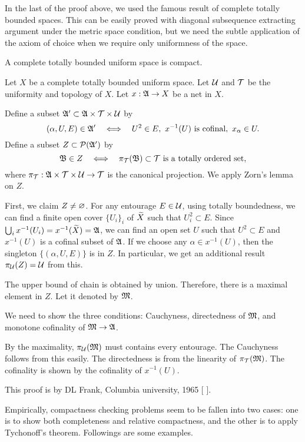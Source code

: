 \documentclass{../exp}
\begin{document}
In the last of the proof above, we used the famous result of complete totally bounded spaces.
This can be easily proved with diagonal subsequence extracting argument under the metric space condition, but we need the subtle application of the axiom of choice when we require only uniformness of the space.

\begin{thm}
A complete totally bounded uniform space is compact.
\end{thm}
\begin{pf}[1]
Let $X$ be a complete totally bounded uniform space.
Let $\mathcal{U}$ and $\mathcal{T}$ be the uniformity and topology of $X$.
Let $x:\fA\to X$ be a net in $X$.

Define a subset $\mathfrak{A}'\subset\mathfrak{A}\times\mathcal{T}\times\mathcal{U}$ by
\[(\alpha,U,E)\in\fA'\iff U^2\in E,\ x^{-1}(U)\text{ is cofinal},\ x_\alpha\in U.\]
Define a subset $Z\subset\mathcal{P}(\mathfrak{A}')$ by
\[\fB\in Z\iff \pi_\cT(\fB)\subset\cT\text{ is a totally ordered set},\]
where $\pi_\cT:\fA\x\cT\x\cU\to\cT$ is the canonical projection.
We apply Zorn's lemma on $Z$.

First, we claim $Z\ne\varnothing$.
For any entourage $E\in\mathcal{U}$, using totally boundedness, we can find a finite open cover $\{U_i\}_i$ of $\widetilde X$ such that $U_i^2\subset E$.
Since $\bigcup_ix^{-1}(U_i)=x^{-1}(\widetilde X)=\mathfrak{A}$, we can find an open set $U$ such that $U^2\subset E$ and $x^{-1}(U)$ is a cofinal subset of $\mathfrak{A}$.
If we choose any $\alpha\in x^{-1}(U)$, then the singleton $\{(\alpha,U,E)\}$ is in $Z$.
In particular, we get an additional result $\pi_{\mathcal{U}}(Z)=\mathcal{U}$ from this.

The upper bound of chain is obtained by union.
Therefore, there is a maximal element in $Z$.
Let it denoted by $\mathfrak{M}$.

We need to show the three conditions: Cauchyness, directedness of $\mathfrak{M}$, and monotone cofinality of $\fM\to\fA$.

By the maximality, $\pi_{\mathcal{U}}(\mathfrak{M})$ must contains every entourage.
The Cauchyness follows from this easily.
The directedness is from the linearity of $\pi_{\mathcal{T}}(\mathfrak{M})$.
The cofinality is shown by the cofinality of $x^{-1}(U)$.
\end{pf}
\begin{pf}[2]
This proof is by DL Frank, Columbia university, 1965 [ ].

\end{pf}


Empirically, compactness checking problems seem to be fallen into two cases: one is to show both completeness and relative compactness, and the other is to apply Tychonoff's theorem.
Followings are some examples.
\end{document}
